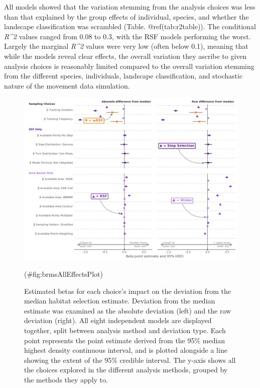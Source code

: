 \documentclass[10pt,a4paper]{article}
\begin{document}
All models showed that the variation stemming from the analysis choices was less than that explained by the group effects of individual, species, and whether the landscape classification was scrambled (Table. @ref(tab:r2table)).
The conditional \emph{R\^{}2} values ranged from 0.08 to 0.3, with the RSF models performing the worst.
Largely the marginal \emph{R\^{}2} values were very low (often below 0.1), meaning that while the models reveal clear effects, the overall variation they ascribe to given analysis choices is reasonably limited compared to the overall variation stemming from the different species, individuals, landscape classification, and stochastic nature of the movement data simulation.

\begin{figure}
\includegraphics[width=1\linewidth]{../figures/_allEffectsPlot} \caption{Estimated betas for each choice's impact on the deviation from the median habitat selection estimate. Deviation from the median estimate was examined as the absolute deviation (left) and the raw deviation (right). All eight independent models are displayed together, split between analysis method and deviation type. Each point represents the point estimate derived from the 95\% median highest density continuous interval, and is plotted alongside a line showing the extent of the 95\% credible interval. The y-axis shows all the choices explored in the different analysis methods, grouped by the methods they apply to.}(\#fig:brmsAllEffectsPlot)
\end{figure}
\end{document}
